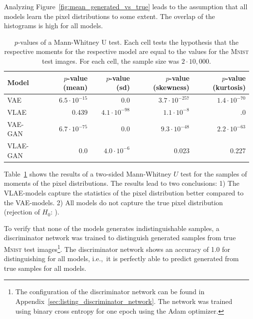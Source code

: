 Analyzing Figure~\ref{fig:mean_generated_vs_true} leads to the assumption that all models learn the pixel distributions to some extent.
The overlap of the histograms is high for all models.
\begin{table}
    \begin{tabular}{lrrrr}
        \toprule
        Model              & $p$-value (mean)    & $p$-value (sd)      & $p$-value (skewness) & $p$-value (kurtosis) \\
        \midrule
        \ac{VAE}           & $6.5\cdot 10^{-15}$ & 0.0                 & $3.7\cdot 10^{-257}$ & $1.4\cdot 10^{-70}$  \\
        \ac{VLAE}          & 0.439               & $4.1\cdot 10^{-98}$ & $1.1\cdot 10^{-8}$   & .0                   \\
        \ac{VAE}-\ac{GAN}  & $6.7\cdot 10^{-75}$ & 0.0                 & $9.3\cdot 10^{-48}$  & $2.2\cdot 10^{-63}$  \\
        \ac{VLAE}-\ac{GAN} & 0.0                 & $4.0\cdot 10^{-6}$  & 0.023                & 0.227                \\
        \bottomrule
    \end{tabular}
    \caption[Models on \textsc{Mnist} - $p$-values for Distributions]{$p$-values of a Mann-Whitney U test. Each cell tests the hypothesis that the respective moments for the respective model are equal to the values for the \textsc{Mnist} test images. For each cell, the sample size was $2\cdot 10,000$.}
    \label{tab:vae-vlae-mnist}
\end{table}
Table~\ref{tab:vae-vlae-mnist} shows the results of a two-sided Mann-Whitney $U$ test for the samples of moments of the pixel distributions.
The results lead to two conclusions: 1) The \ac{VLAE}-models capture the statistics of the pixel distribution better compared to the \ac{VAE}-models.
2) All models do not capture the true pixel distribution (rejection of $H_0$: ).

To verify that none of the models generates indistinguishable samples, a discriminator network was trained to distinguish generated samples from true \textsc{Mnist} test images\footnote{The configuration of the discriminator network can be found in Appendix~\ref{sec:listing_discriminator_network}. The network was trained using binary cross entropy for one epoch using the Adam optimizer.}.
The discriminator network shows an accuracy of 1.0 for distinguishing for all models, i.e.,~it is perfectly able to predict generated from true samples for all models.

